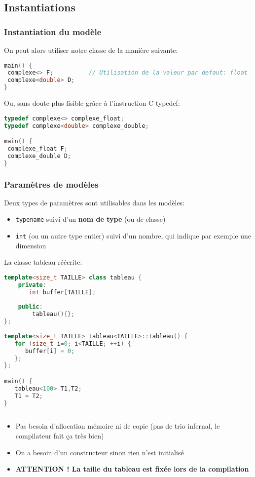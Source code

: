 \documentclass{beamer}
\begin{document}
\subsection{Instantiations}

\begin{frame}[fragile=singleslide,shrink=20]
\frametitle {Instantiation du modèle}

On peut alors utiliser notre classe de la manière suivante:
\begin{lstlisting}[language=c++]
main() {
 complexe<> F;          // Utilisation de la valeur par defaut: float
 complexe<double> D;
}
\end{lstlisting}

Ou, sans doute plus lisible grâce à l'instruction C typedef:
\begin{lstlisting}[language=c++]
typedef complexe<> complexe_float;
typedef complexe<double> complexe_double;

main() {
 complexe_float F;
 complexe_double D;
}
\end{lstlisting}
\end{frame}

\begin{frame}[fragile=singleslide,shrink=20]
\frametitle {Paramètres de modèles}

Deux types de paramètres sont utilisables dans les modèles:

\begin{itemize}
\item{\texttt{typename} suivi d'un \textbf{nom de type} (ou de classe) }
\item{\texttt{int} (ou un autre type entier) suivi d'un nombre, qui indique par exemple une dimension}
\end{itemize}

La classe tableau réécrite:
\begin{lstlisting}[language=c++]
template<size_t TAILLE> class tableau {
    private:
       int buffer[TAILLE];
    
    public:
        tableau(){};
};
    
template<size_t TAILLE> tableau<TAILLE>::tableau() {
   for (size_t i=0; i<TAILLE; ++i) { 
      buffer[i] = 0; 
   };
};

main() {
   tableau<100> T1,T2;
   T1 = T2;
}
   
\end{lstlisting}

\begin{itemize}
\item{Pas besoin d'allocation mémoire ni de copie (pas de trio infernal, le compilateur fait ça très bien)}
\item{On a besoin d'un constructeur sinon rien n'est initialisé}
\item{\textbf{ATTENTION ! La taille du tableau est fixée lors de la compilation}}
\end{itemize}
\end{frame}
\end{document}
